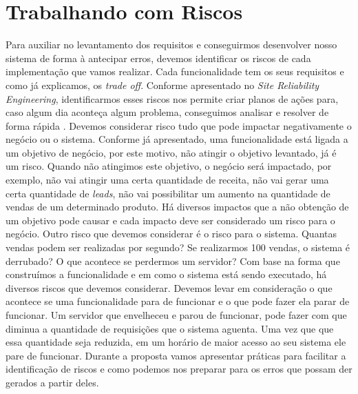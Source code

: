   \section{Trabalhando com Riscos}
    Para auxiliar no levantamento dos requisitos e conseguirmos desenvolver nosso
    sistema de forma à antecipar erros, devemos identificar os riscos de cada
    implementação que vamos realizar. Cada funcionalidade tem os seus requisitos
    e como já explicamos, os \textit{trade off}. Conforme apresentado no \textit{
    Site Reliability Engineering}, identificarmos esses riscos nos permite
    criar planos de ações para, caso algum dia aconteça algum problema, conseguimos
    analisar e resolver de forma rápida \cite{SiteReliabilityEngineering}. \newline
    Devemos considerar risco tudo que pode impactar negativamente o negócio ou o
    sistema. Conforme já apresentado, uma funcionalidade está ligada a um objetivo
    de negócio, por este motivo, não atingir o objetivo levantado, já é um risco.
    Quando não atingimos este objetivo, o negócio será impactado, por exemplo,
    não vai atingir uma certa quantidade de receita, não vai gerar uma certa
    quantidade de \textit{leads}, não vai possibilitar um aumento na quantidade
    de vendas de um determinado produto. Há diversos impactos que a não obtenção
    de um objetivo pode causar e cada impacto deve ser considerado um risco para
    o negócio. \newline
    Outro risco que devemos considerar é o risco para o sistema. Quantas vendas
    podem ser realizadas por segundo? Se realizarmos 100 vendas, o sistema é
    derrubado? O que acontece se perdermos um servidor? Com base na forma que
    construímos a funcionalidade e em como o sistema está sendo executado, há
    diversos riscos que devemos considerar. Devemos levar em consideração o que
    acontece se uma funcionalidade para de funcionar e o que pode fazer ela parar
    de funcionar. Um servidor que envelheceu e parou de funcionar, pode fazer com
    que diminua a quantidade de requisições que o sistema aguenta. Uma vez que
    que essa quantidade seja reduzida, em um horário de maior acesso ao seu sistema
    ele pare de funcionar. \newline
    Durante a proposta vamos apresentar práticas para facilitar a identificação
    de riscos e como podemos nos preparar para os erros que possam der gerados a
    partir deles.

